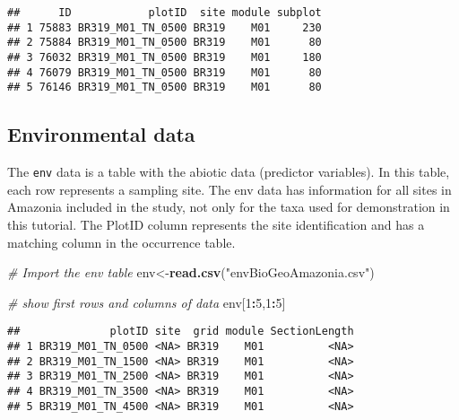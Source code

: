 \documentclass[]{article}
\newenvironment{Shaded}{\begin{snugshade}}{\end{snugshade}}
\newcommand{\CommentTok}[1]{\textcolor[rgb]{0.56,0.35,0.01}{\textit{#1}}}
\newcommand{\DecValTok}[1]{\textcolor[rgb]{0.00,0.00,0.81}{#1}}
\newcommand{\KeywordTok}[1]{\textcolor[rgb]{0.13,0.29,0.53}{\textbf{#1}}}
\newcommand{\NormalTok}[1]{#1}
\newcommand{\OperatorTok}[1]{\textcolor[rgb]{0.81,0.36,0.00}{\textbf{#1}}}
\newcommand{\StringTok}[1]{\textcolor[rgb]{0.31,0.60,0.02}{#1}}
\begin{document}
\begin{verbatim}
##      ID            plotID  site module subplot
## 1 75883 BR319_M01_TN_0500 BR319    M01     230
## 2 75884 BR319_M01_TN_0500 BR319    M01      80
## 3 76032 BR319_M01_TN_0500 BR319    M01     180
## 4 76079 BR319_M01_TN_0500 BR319    M01      80
## 5 76146 BR319_M01_TN_0500 BR319    M01      80
\end{verbatim}

\hypertarget{environmental-data}{%
\subsection{Environmental data}\label{environmental-data}}

The \texttt{env} data is a table with the abiotic data (predictor
variables). In this table, each row represents a sampling site. The env
data has information for all sites in Amazonia included in the study,
not only for the taxa used for demonstration in this tutorial. The
PlotID column represents the site identification and has a matching
column in the occurrence table.

\begin{Shaded}
\begin{Highlighting}[]
\CommentTok{# Import the env table}
\NormalTok{env<-}\KeywordTok{read.csv}\NormalTok{(}\StringTok{"envBioGeoAmazonia.csv"}\NormalTok{)}


\CommentTok{# show first rows and columns of data}
\NormalTok{env[}\DecValTok{1}\OperatorTok{:}\DecValTok{5}\NormalTok{,}\DecValTok{1}\OperatorTok{:}\DecValTok{5}\NormalTok{]}
\end{Highlighting}
\end{Shaded}

\begin{verbatim}
##              plotID site  grid module SectionLength
## 1 BR319_M01_TN_0500 <NA> BR319    M01          <NA>
## 2 BR319_M01_TN_1500 <NA> BR319    M01          <NA>
## 3 BR319_M01_TN_2500 <NA> BR319    M01          <NA>
## 4 BR319_M01_TN_3500 <NA> BR319    M01          <NA>
## 5 BR319_M01_TN_4500 <NA> BR319    M01          <NA>
\end{verbatim}

\begin{Shaded}
\end{Shaded}
\end{document}
